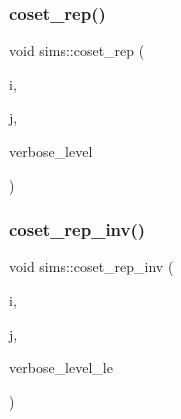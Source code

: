 \mbox{\label{classsims_a3d669dba4d005cd2399388f27f44cd04}} 
\subsubsection{\texorpdfstring{coset\+\_\+rep()}{coset\_rep()}}
{\footnotesize\ttfamily void sims\+::coset\+\_\+rep (\begin{DoxyParamCaption}\item[{\mbox{\hyperlink{galois_8h_a09fddde158a3a20bd2dcadb609de11dc}{I\+NT}}}]{i,  }\item[{\mbox{\hyperlink{galois_8h_a09fddde158a3a20bd2dcadb609de11dc}{I\+NT}}}]{j,  }\item[{\mbox{\hyperlink{galois_8h_a09fddde158a3a20bd2dcadb609de11dc}{I\+NT}}}]{verbose\+\_\+level }\end{DoxyParamCaption})}

\mbox{\label{classsims_a388f523d4ec997fce4e9ede924de99b9}} 
\subsubsection{\texorpdfstring{coset\+\_\+rep\+\_\+inv()}{coset\_rep\_inv()}}
{\footnotesize\ttfamily void sims\+::coset\+\_\+rep\+\_\+inv (\begin{DoxyParamCaption}\item[{\mbox{\hyperlink{galois_8h_a09fddde158a3a20bd2dcadb609de11dc}{I\+NT}}}]{i,  }\item[{\mbox{\hyperlink{galois_8h_a09fddde158a3a20bd2dcadb609de11dc}{I\+NT}}}]{j,  }\item[{\mbox{\hyperlink{galois_8h_a09fddde158a3a20bd2dcadb609de11dc}{I\+NT}}}]{verbose\+\_\+level\+\_\+le }\end{DoxyParamCaption})}

\mbox{\label{classsims_a239905009eec41ca1ca7ed9b794e1d0f}} 
